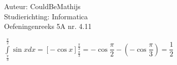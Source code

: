 \documentclass[a4paper]{article}
\newcommand{\bepint}{\displaystyle\int\limits}
\begin{document}
  
\noindent \large Auteur: CouldBeMathijs \\
\noindent \large Studierichting: Informatica\\
\noindent \large Oefeningenreeks 5A nr. 4.11\\

\medskip

\normalsize

$\bepint_\tfrac{\pi}{3}^\tfrac{\pi}{2} \sin x dx = [- \cos x]_\tfrac{\pi}{3}^\tfrac{\pi}{2} = - \cos \dfrac{\pi}{2} - \left(- \cos \dfrac{\pi}{3}\right) = \dfrac{1}{2}$

\begin{thebibliography}{999}
\end{thebibliography}
\end{document}

